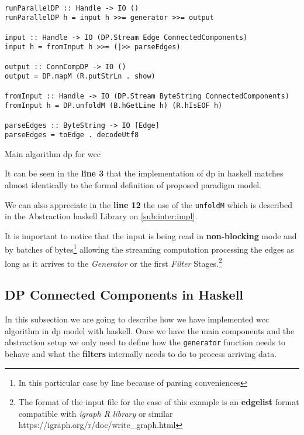 \documentclass[preprint]{elsarticle}
\begin{document}
\begin{listing}[H]
\begin{verbatim}

runParallelDP :: Handle -> IO ()
runParallelDP h = input h >>= generator >>= output

input :: Handle -> IO (DP.Stream Edge ConnectedComponents)
input h = fromInput h >>= (|>> parseEdges)

output :: ConnCompDP -> IO ()
output = DP.mapM (R.putStrLn . show)

fromInput :: Handle -> IO (DP.Stream ByteString ConnectedComponents)
fromInput h = DP.unfoldM (B.hGetLine h) (R.hIsEOF h)

parseEdges :: ByteString -> IO [Edge]
parseEdges = toEdge . decodeUtf8

\end{verbatim}
\caption{Main algorithm \acrshort{dp} for \acrshort{wcc}}
\label{src:haskell:1}
\end{listing}

It can be seen in the \textbf{line 3} that the implementation of \acrshort{dp} in \acrshort{haskell} matches almost identically to the formal definition of proposed paradigm model.

We can also appreciate in the \textbf{line 12} the use of the \texttt{unfoldM} which is described in the Abstraction \acrshort{haskell} Library on \autoref{sub:inter:impl}.

It is important to notice that the input is being read in \textbf{non-blocking} mode and by batches of bytes\footnote{In this particular case by line because of parsing conveniences} allowing the streaming computation processing the edges as long as it arrives to the \textit{Generator} or the first \textit{Filter} Stages.\footnote{The format of the input file for the case of this example is an \textbf{edgelist} format compatible with \emph{igraph R library} or similar https://igraph.org/r/doc/write\_graph.html}

\subsection{\textbf{DP Connected Components in Haskell}}
In this subsection we are going to describe how we have implemented \acrshort{wcc} algorithm in \acrshort{dp} model with \acrshort{haskell}. Once we have the main components and the abstraction setup we only need to define how the \texttt{generator} function needs to behave and what the \textbf{filters} internally needs to do to process arriving data. 
\end{document}
